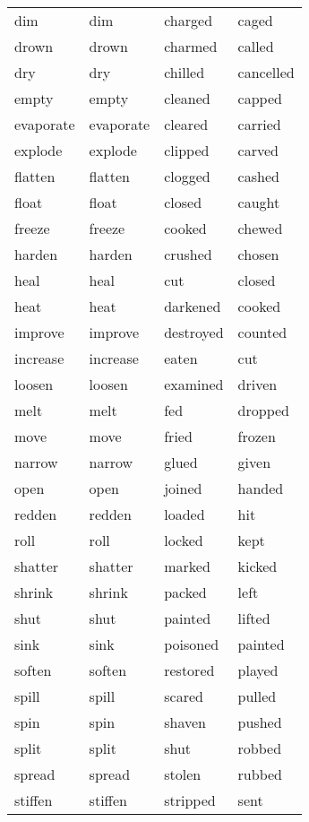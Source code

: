 \documentclass[output=paper]{langsci/langscibook}
\begin{document}
\begin{paperappendix}
{\begin{longtable}{ *{4}{>{\raggedright\arraybackslash}p{}} }
dim       & dim       & charged    & caged\\
drown     & drown     & charmed    & called\\
dry       & dry       & chilled    & cancelled \\
empty     & empty     & cleaned    & capped\\
evaporate & evaporate & cleared    & carried\\
explode   & explode   & clipped    & carved\\
flatten   & flatten   & clogged    & cashed\\
float     & float     & closed     & caught\\
freeze    & freeze    & cooked     & chewed\\
harden    & harden    & crushed    & chosen\\
heal      & heal      & cut        & closed\\
heat      & heat      & darkened   & cooked\\
improve   & improve   & destroyed  & counted\\
increase  & increase  & eaten      & cut\\
loosen    & loosen    & examined   & driven\\
melt      & melt      & fed        & dropped\\
move      & move      & fried      & frozen\\
narrow    & narrow    & glued      & given\\
open      & open      & joined     & handed\\
redden    & redden    & loaded     & hit\\
roll      & roll      & locked     & kept\\
shatter   & shatter   & marked    & kicked\\
shrink    & shrink    & packed    & left\\
shut      & shut      & painted   & lifted\\
sink      & sink      & poisoned  & painted\\
soften    & soften    & restored  & played\\
spill     & spill     & scared    & pulled\\
spin      & spin      & shaven    & pushed\\
split     & split     & shut      & robbed\\
spread    & spread    & stolen    & rubbed\\
stiffen   & stiffen   & stripped  & sent\\

\end{longtable}}
\end{paperappendix}
\end{document}
